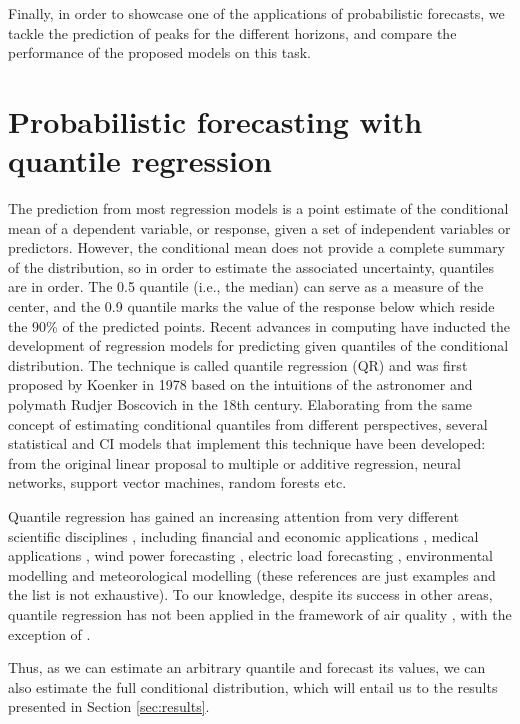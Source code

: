 \documentclass[a4paper,twocolumn,5p]{elsarticle}
\begin{document}
Finally, in order to showcase one of the applications of probabilistic
forecasts, we tackle the prediction of \no peaks for the different
horizons, and compare the performance of the proposed models on this
task. 

\section{Probabilistic forecasting with quantile regression}
\label{sec:probForec}

The prediction from most regression models is a point estimate of the
conditional mean of a dependent variable, or response, given a set of
independent variables or predictors. However, the conditional mean
does not provide a complete summary of the distribution, so in order
to estimate the associated uncertainty, quantiles are in order. The
0.5 quantile (i.e., the median) can serve as a measure of the center,
and the 0.9 quantile marks the value of the response below which
reside the 90\% of the predicted points. Recent advances in computing
have inducted the development of regression models for predicting
given quantiles of the conditional distribution. The technique is
called quantile regression (QR) and was first proposed by Koenker in
1978 \cite{koenker_quantile_2001} based on the intuitions of the
astronomer and polymath Rudjer Boscovich in the 18th
century. Elaborating from the same concept of estimating conditional
quantiles from different perspectives, several statistical and CI
models that implement this technique have been developed: from the
original linear proposal to multiple or additive regression, neural
networks, support vector machines, random forests etc.

Quantile regression has gained an increasing attention from very
different scientific disciplines \cite{yu_quantile_2003}, including
financial and economic applications \cite{ben_rejeb_financial_2016},
medical applications \cite{jang_quantile_2018}, wind power forecasting
\cite{wan_direct_2017}, electric load forecasting
\cite{lebotsa_short_2018}, environmental modelling
\cite{cade_gentle_2003} and meteorological modelling
\cite{baur_modelling_2004} (these references are just examples and the
list is not exhaustive). To our knowledge, despite its success in
other areas, quantile regression has not been applied in the framework
of air quality , with the exception of
\cite{martinezsilva_forecasting_2016}.

Thus, as we can estimate an arbitrary quantile and forecast its
values, we can also estimate the full conditional distribution, which
will entail us to the results presented in Section \ref{sec:results}.
\end{document}
